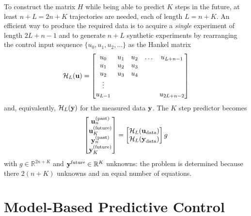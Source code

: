 To construct the matrix $H$ while being able to predict $K$ steps in the future, at least $n+L=2n+K$ trajectories are needed, each of length $L=n+K$. An efficient way to produce the required data is to acquire a \emph{single} experiment of length $2L+n-1$ and to generate $n+L$ synthetic experiments by rearranging the control input sequence $\{u_0, u_1, u_2,\ldots\}$ as the Hankel matrix
\begin{equation*}
  \mathcal{H}_L(\boldsymbol{\mathrm{u}}) =
  \begin{bmatrix}
    u_0 & u_1 & u_2 & \ldots & u_{L+n-1} \\
    u_1 & u_2 & u_3  \\
    u_2 & u_3 & u_4 \\
    \vdots \\
    u_{L-1} & & & & u_{2L+n-2}
  \end{bmatrix}
\end{equation*}
and, equivalently, $\mathcal{H}_L(\boldsymbol{\mathrm{y}})$ for the measured data $\boldsymbol{\mathrm{y}}$. The $K$ step predictor becomes
\begin{equation*}
  \label{eq:deepc-K-steps-predictor-H}
  \begin{bmatrix}
    \boldsymbol{\mathrm{u}}_n^{(\textrm{past})} \\ \boldsymbol{\mathrm{u}}_K^{(\textrm{future})} \\ \boldsymbol{\mathrm{y}}_n^{(\textrm{past})} \\ \boldsymbol{\mathrm{y}}_K^{(\textrm{future})}
  \end{bmatrix} =
  \begin{bmatrix}
    \mathcal{H}_L(\boldsymbol{\mathrm{u}}_\textrm{data}) \\ \mathcal{H}_L(\boldsymbol{\mathrm{y}}_\textrm{data})
  \end{bmatrix} g
\end{equation*}
with $g\in \mathbb{R}^{2n+K}$ and $\boldsymbol{\mathrm{y}}^\textrm{future}\in\mathbb{R}^K$ unknowns: the problem is determined because there $2(n+K)$ unknowns and an equal number of equations.


\section{Model-Based Predictive Control}
\label{sec:model-based-predictive-control}


